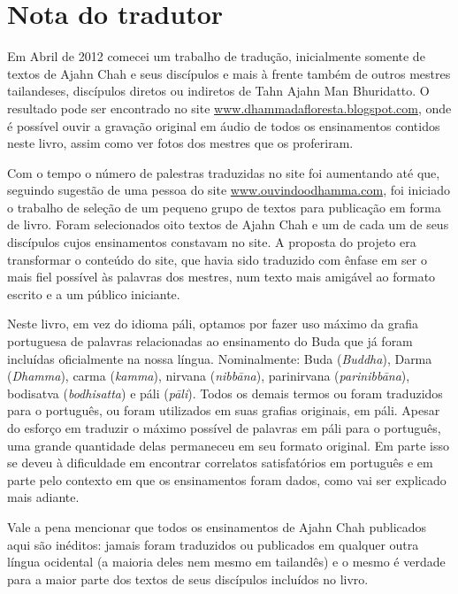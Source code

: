 
\chapter{Nota do tradutor}

Em Abril de 2012 comecei um trabalho de tradução, inicialmente
somente de textos de Ajahn Chah e seus discípulos e mais à frente
também de outros mestres tailandeses, discípulos diretos ou indiretos
de Tahn Ajahn Man Bhuridatto. O resultado pode ser encontrado no site
\href{http://www.dhammadafloresta.blogspot.com/}{www.dhammadafloresta.blogspot.com},
onde é possível ouvir a gravação original em áudio de todos os
ensinamentos contidos neste livro, assim como ver fotos dos mestres que
os proferiram. 

Com o tempo o número de palestras traduzidas no site foi aumentando
até que, seguindo sugestão de uma pessoa do site
\href{http://www.ouvindoodhamma.com}{www.ouvindoodhamma.com}, foi iniciado o trabalho de seleção de um
pequeno grupo de textos para publicação em forma de livro. Foram
selecionados oito textos de Ajahn Chah e um de cada um de seus
discípulos cujos ensinamentos constavam no site. A proposta do projeto
era transformar o conteúdo do site, que havia sido traduzido com ênfase
em ser o mais fiel possível às palavras dos mestres, num texto mais
amigável ao formato escrito e a um público iniciante. 

Neste livro, em vez do idioma páli, optamos por fazer uso máximo da
grafia portuguesa de palavras relacionadas ao ensinamento do Buda que
já foram incluídas oficialmente na nossa língua. Nominalmente: Buda
(\emph{Buddha}), Darma (\emph{Dhamma}), carma (\emph{kamma}),
nirvana (\emph{nibbāna}), parinirvana (\emph{parinibbāna}),
bodisatva (\emph{bodhisatta}) e páli (\emph{pāli}). Todos os
demais termos ou foram traduzidos para o português, ou foram utilizados
em suas grafias originais, em páli. Apesar do esforço em traduzir o
máximo possível de palavras em páli para o português, uma grande
quantidade delas permaneceu em seu formato original. Em parte isso se
deveu à dificuldade em encontrar correlatos satisfatórios em português
e em parte pelo contexto em que os ensinamentos foram dados, como vai
ser explicado mais adiante.

Vale a pena mencionar que todos os ensinamentos de Ajahn Chah
publicados aqui são inéditos: jamais foram traduzidos ou publicados em
qualquer outra língua ocidental (a maioria deles nem mesmo em
tailandês) e o mesmo é verdade para a maior parte dos textos de seus
discípulos incluídos no livro. 

